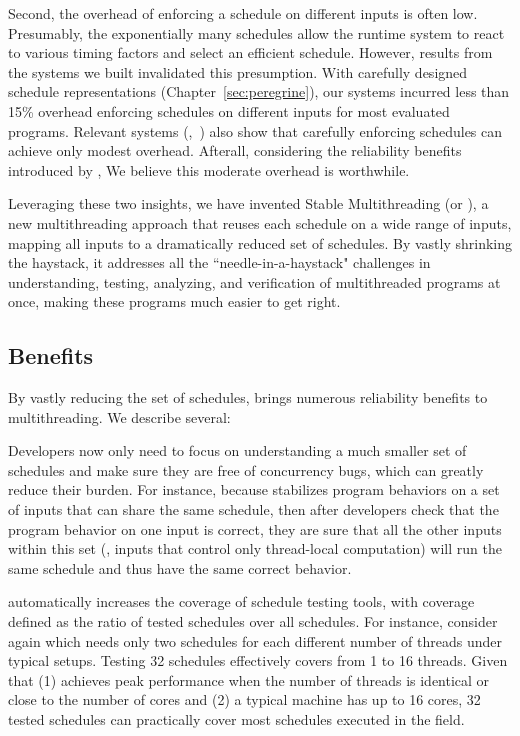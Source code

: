 Second, the overhead of enforcing a schedule on different inputs is often low.
Presumably, the exponentially many schedules allow the
runtime system to react to various timing factors and select an
efficient schedule.  However, results from the \smt systems we built
invalidated this presumption.  With carefully designed schedule
representations (Chapter~\ref{sec:peregrine}), our systems incurred less than
15\%
overhead enforcing schedules on different inputs for most evaluated programs.
Relevant systems (\eg,~\cite{kendo:asplos09, determinator:osdi10}) also show
that
carefully enforcing schedules can achieve only modest overhead. Afterall,
considering the reliability benefits introduced by \smt, We believe
this moderate overhead is worthwhile.

Leveraging these two insights, we have invented Stable Multithreading (or \smt),
a new multithreading approach that reuses each schedule on a wide range of
inputs, mapping all inputs to a dramatically reduced set of schedules.
By vastly shrinking the haystack, it addresses all the ``needle-in-a-haystack"
challenges in understanding, testing, analyzing, and verification of
multithreaded programs at once, making these programs much easier to get
right.

\subsection{Benefits}

By vastly reducing the set of schedules, \smt brings numerous reliability
benefits to multithreading.  We describe several:

 Developers now only need to focus on understanding a much
smaller set of schedules and make sure they are free of concurrency bugs, which
can greatly reduce their burden. For instance, because \smt stabilizes program
behaviors on a set of inputs that can share the same schedule, then
after developers check that the program behavior on one input is correct, they
are sure that all the other inputs within this set (\eg, inputs that control
only thread-local computation) will run the same schedule and thus have the same
correct behavior.

 \smt automatically
increases the coverage of schedule testing tools, with coverage
defined as the ratio of tested schedules over all schedules.
For instance, consider \pbzip again which needs only two
schedules for each different number of threads under typical setups.  Testing 32
schedules effectively covers from 1 to 16 threads.  Given that (1) \pbzip
achieves peak performance when the number of threads is identical or close to
the number of cores and (2) a typical machine has up to 16 cores, 32 tested
schedules can practically cover most schedules executed in the field.

